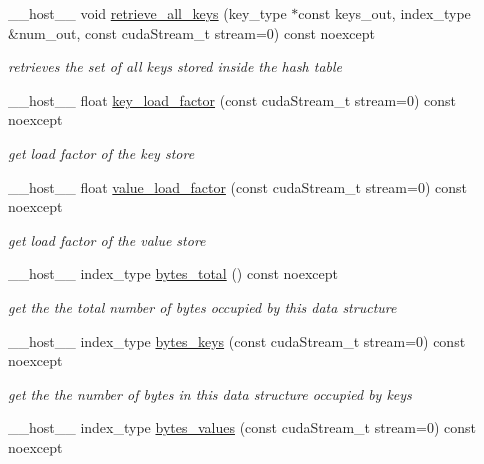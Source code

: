\begin{DoxyCompactItemize}
\+\_\+\+\_\+host\+\_\+\+\_\+ void \hyperlink{classwarpcore_1_1BucketListHashTable_a7a18e1ca36d20f6ce9f466ac7d58ef0b}{retrieve\+\_\+all\+\_\+keys} (key\+\_\+type $\ast$const keys\+\_\+out, index\+\_\+type \&num\+\_\+out, const cuda\+Stream\+\_\+t stream=0) const noexcept
\begin{DoxyCompactList}\small\item\em retrieves the set of all keys stored inside the hash table \end{DoxyCompactList}\item 
\+\_\+\+\_\+host\+\_\+\+\_\+ float \hyperlink{classwarpcore_1_1BucketListHashTable_ac0a51f17e2c2deaee7ad80e491b96259}{key\+\_\+load\+\_\+factor} (const cuda\+Stream\+\_\+t stream=0) const noexcept
\begin{DoxyCompactList}\small\item\em get load factor of the key store \end{DoxyCompactList}\item 
\+\_\+\+\_\+host\+\_\+\+\_\+ float \hyperlink{classwarpcore_1_1BucketListHashTable_a710d3038814c3db16ac5b1fa4df84204}{value\+\_\+load\+\_\+factor} (const cuda\+Stream\+\_\+t stream=0) const noexcept
\begin{DoxyCompactList}\small\item\em get load factor of the value store \end{DoxyCompactList}\item 
\+\_\+\+\_\+host\+\_\+\+\_\+ index\+\_\+type \hyperlink{classwarpcore_1_1BucketListHashTable_ae650ae236642939884805bdf2f825e2f}{bytes\+\_\+total} () const noexcept
\begin{DoxyCompactList}\small\item\em get the the total number of bytes occupied by this data structure \end{DoxyCompactList}\item 
\+\_\+\+\_\+host\+\_\+\+\_\+ index\+\_\+type \hyperlink{classwarpcore_1_1BucketListHashTable_a6f8e4a83670a301f53e923d2fe9a3507}{bytes\+\_\+keys} (const cuda\+Stream\+\_\+t stream=0) const noexcept
\begin{DoxyCompactList}\small\item\em get the the number of bytes in this data structure occupied by keys \end{DoxyCompactList}\item 
\+\_\+\+\_\+host\+\_\+\+\_\+ index\+\_\+type \hyperlink{classwarpcore_1_1BucketListHashTable_afbd37a57c5137cc44881470c80a60bc3}{bytes\+\_\+values} (const cuda\+Stream\+\_\+t stream=0) const noexcept

\end{DoxyCompactItemize}

